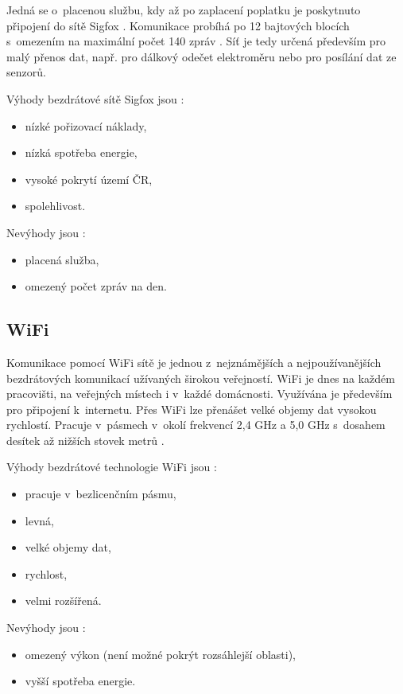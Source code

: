 Jedná se o~placenou službu, kdy až po zaplacení poplatku je poskytnuto připojení do sítě Sigfox \cite{Sigfox_Zooco}. Komunikace probíhá po 12 bajtových 
blocích s~omezením na maximální počet 140 zpráv \cite{Sigfox_Zooco}. Síť je tedy určená především pro malý přenos dat, např. pro dálkový odečet elektroměru 
nebo pro posílání dat ze senzorů. 

Výhody bezdrátové sítě Sigfox jsou \cite{Sigfox_cz} \cite{Sigfox_Zooco}:
\begin{itemize}
  \item nízké pořizovací náklady,
  \item nízká spotřeba energie,
  \item vysoké pokrytí území ČR,
  \item spolehlivost.
\end{itemize}

Nevýhody jsou \cite{Sigfox_cz}:
\begin{itemize}
  \item placená služba,
  \item omezený počet zpráv na den.
\end{itemize}

\subsection{WiFi}
Komunikace pomocí WiFi sítě je jednou z~nejznámějších a nejpoužívanějších bezdrátových komunikací užívaných širokou veřejností. 
WiFi je dnes na každém pracovišti, na veřejných místech i v~každé domácnosti. Využívána je především pro připojení k~internetu. 
Přes WiFi lze přenášet velké objemy dat vysokou rychlostí. Pracuje v~pásmech v~okolí frekvencí 2,4 GHz a 5,0 GHz s~dosahem 
desítek až nižších stovek metrů \cite{Bezdrat_muni}. 

Výhody bezdrátové technologie WiFi jsou \cite{Bezdrat_muni}:
\begin{itemize}
  \item pracuje v~bezlicenčním pásmu, 
  \item levná, 
  \item velké objemy dat,
  \item rychlost,
  \item velmi rozšířená.
\end{itemize}

Nevýhody jsou \cite{Bezdrat_muni}:
\begin{itemize}
  \item omezený výkon (není možné pokrýt rozsáhlejší oblasti), 
  \item vyšší spotřeba energie.
\end{itemize}


